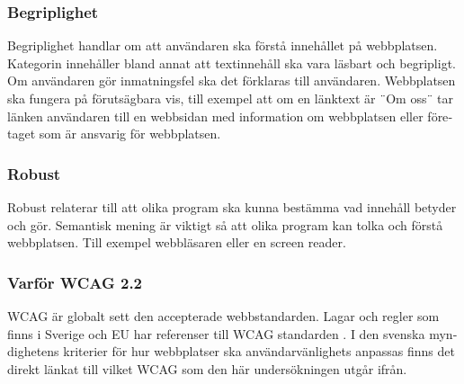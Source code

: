 \documentclass[11p]{article}
\begin{document}
\begin{otherlanguage}{swedish}
    \subsubsection{Begriplighet}
    Begriplighet handlar om att användaren ska förstå innehållet på webbplatsen.
    Kategorin innehåller bland annat att textinnehåll ska vara läsbart och begripligt.
    Om användaren gör inmatningsfel ska det förklaras till användaren.
    Webbplatsen ska fungera på förutsägbara vis, till exempel att om en länktext är ¨Om oss¨ tar länken användaren till en webbsidan med information om webbplatsen eller företaget som är ansvarig för webbplatsen.

    \subsubsection{Robust}
    Robust relaterar till att olika program ska kunna bestämma vad innehåll betyder och gör.
    Semantisk mening är viktigt så att olika program kan tolka och förstå webbplatsen.
    Till exempel webbläsaren eller en screen reader.

    \subsubsection{Varför WCAG 2.2}
    WCAG är globalt sett den accepterade webbstandarden.
    Lagar och regler som finns i Sverige och EU har referenser till WCAG standarden \parencite{Utförande_av_Dos_lagen}.
    I den svenska myndighetens kriterier för hur webbplatser ska användarvänlighets anpassas finns det direkt länkat till vilket WCAG som den här undersökningen utgår ifrån. \parencite{Utförande_av_Dos_lagen}



\end{otherlanguage}
\end{document}
